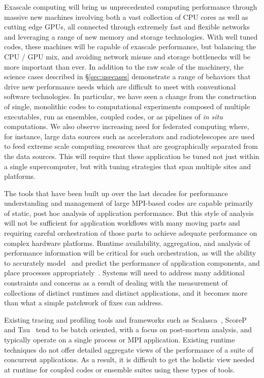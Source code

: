 Exascale computing will bring us unprecedented computing performance through massive new machines involving both a vast collection of CPU cores as well as cutting edge GPUs, all connected through extremely fast and flexible networks and leveraging a range of new memory and storage technologies. With well tuned codes, these machines will be capable of exascale performance, but balancing the CPU / GPU mix, and avoiding network misuse and storage bottlenecks will be more important than ever. In addition to the raw scale of the machinery, the science cases described in \S\ref{sec:usecases} demonstrate a range of behaviors that drive new performance needs which are difficult to meet with conventional software technologies. In particular, we have seen a change from the construction of single, monolithic codes to computational experiments composed of multiple executables, run as ensembles, coupled codes, or as pipelines of \textit{in situ} computations. We also observe increasing need for federated computing where, for instance, large data sources such as accelerators and radiotelescopes are used to feed extreme scale computing resources that are geographically separated from the data sources. This will require that these application be tuned not just within a single supercomputer, but with tuning strategies that span multiple sites and platforms.

The tools that have been built up over the last decades for performance understanding and management of large MPI-based codes are capable primarily of static, post hoc analysis of application performance. But this style of analysis will not be sufficient for application workflows with many moving parts and requiring careful orchestration of those parts to achieve adequate performance on complex hardware platforms. Runtime availability, aggregation, and analysis of performance information will be critical for such orchestration, as will the ability to accurately model~\cite{wanhpcc2017} and predict the performance of application components, and place processes appropriately~\cite{choicluster2017}.
Systems will need to address many additional constraints and concerns as a result of dealing with the measurement of collections of distinct runtimes and distinct applications, and it becomes more than what a simple patchwork of fixes can address.


Existing tracing and profiling tools and frameworks such as Scalasca~\cite{geimer2010scalasca}, ScoreP~\cite{scorep} and Tau~\cite{Shende2006tau} tend to be batch oriented, with a focus on post-mortem analysis, and typically operate on a single process or MPI application. Existing runtime techniques do not offer detailed aggregate views of the performance of a suite of concurrent applications. As a result, it is difficult to get the holistic view needed at runtime for coupled codes or ensemble suites using these types of tools.

